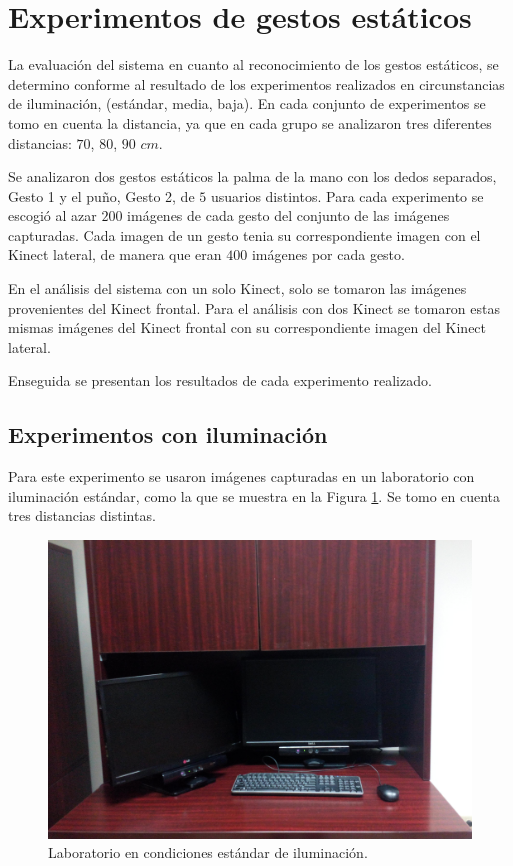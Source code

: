 \section{Experimentos de gestos estáticos}\label{TestStaticGestures}  

La evaluación del sistema en cuanto al reconocimiento de los gestos estáticos, se determino conforme al resultado de los experimentos realizados en circunstancias de iluminación, (estándar, media, baja). En cada conjunto de experimentos se tomo en cuenta la distancia, ya que en cada grupo se analizaron tres diferentes distancias: $70$, $80$, $90$ $cm$.  

Se analizaron dos gestos estáticos la palma de la mano con los dedos separados, Gesto 1 y el puño, Gesto 2, de $5$ usuarios distintos. Para cada experimento se escogió al azar $200$ imágenes de cada gesto del conjunto de las imágenes capturadas. Cada imagen de un gesto tenia su correspondiente imagen con el Kinect lateral, de manera que eran $400$ imágenes por cada gesto. 

En el análisis del sistema con un solo Kinect, solo se tomaron las imágenes provenientes del Kinect frontal. Para el análisis con dos Kinect se tomaron estas mismas imágenes del Kinect frontal con su correspondiente imagen del Kinect lateral.

Enseguida se presentan los resultados de cada experimento realizado.


\subsection{Experimentos con iluminación} 
Para este experimento se usaron imágenes capturadas en un laboratorio con iluminación estándar, como la que se muestra en la Figura \ref{fig:LabIluminado}. Se tomo en cuenta tres distancias distintas. 

\begin{figure}[h!]
\begin{center} 
\includegraphics[scale=0.09]{./Figures/iluminacion.jpg}
\end{center}
\caption{Laboratorio en condiciones estándar de iluminación.}
\label{fig:LabIluminado}
\end{figure} 

